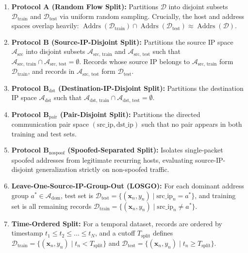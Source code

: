 \documentclass[journal]{IEEEtran}
\begin{document}
\begin{enumerate}
    \item \textbf{Protocol A (Random Flow Split):} Partitions $\mathcal{D}$ into disjoint subsets $\mathcal{D}_{\text{train}}$ and $\mathcal{D}_{\text{test}}$ via uniform random sampling. Crucially, the host and address spaces overlap heavily: $\operatorname{Addrs}(\mathcal{D}_{\text{train}}) \cap \operatorname{Addrs}(\mathcal{D}_{\text{test}}) \approx \operatorname{Addrs}(\mathcal{D})$.
    \item \textbf{Protocol B (Source-IP-Disjoint Split):} Partitions the source IP space $\mathcal{A}_{\text{src}}$ into disjoint subsets $\mathcal{A}_{\text{src, train}}$ and $\mathcal{A}_{\text{src, test}}$ such that $\mathcal{A}_{\text{src, train}} \cap \mathcal{A}_{\text{src, test}} = \emptyset$. Records whose source IP belongs to $\mathcal{A}_{\text{src, train}}$ form $\mathcal{D}_{\text{train}}$, and records in $\mathcal{A}_{\text{src, test}}$ form $\mathcal{D}_{\text{test}}$.
    \item \textbf{Protocol B$_{\text{dst}}$ (Destination-IP-Disjoint Split):} Partitions the destination IP space $\mathcal{A}_{\text{dst}}$ such that $\mathcal{A}_{\text{dst, train}} \cap \mathcal{A}_{\text{dst, test}} = \emptyset$.
    \item \textbf{Protocol B$_{\text{pair}}$ (Pair-Disjoint Split):} Partitions the directed communication pair space $(\text{src\_ip}, \text{dst\_ip})$ such that no pair appears in both training and test sets.
    \item \textbf{Protocol B$_{\text{nospoof}}$ (Spoofed-Separated Split):} Isolates single-packet spoofed addresses from legitimate recurring hosts, evaluating source-IP-disjoint generalization strictly on non-spoofed traffic.
    \item \textbf{Leave-One-Source-IP-Group-Out (LOSGO):} For each dominant address group $a^* \in \mathcal{A}_{\text{dom}}$, test set is $\mathcal{D}_{\text{test}} = \{(\mathbf{x}_n, y_n) \mid \text{src\_ip}_n = a^*\}$, and training set is all remaining records $\mathcal{D}_{\text{train}} = \{(\mathbf{x}_n, y_n) \mid \text{src\_ip}_n \neq a^*\}$.
    \item \textbf{Time-Ordered Split:} For a temporal dataset, records are ordered by timestamp $t_1 \le t_2 \le \dots \le t_N$, and a cutoff $T_{\text{split}}$ defines $\mathcal{D}_{\text{train}} = \{(\mathbf{x}_n, y_n) \mid t_n < T_{\text{split}}\}$ and $\mathcal{D}_{\text{test}} = \{(\mathbf{x}_n, y_n) \mid t_n \ge T_{\text{split}}\}$.
\end{enumerate}
\end{document}
